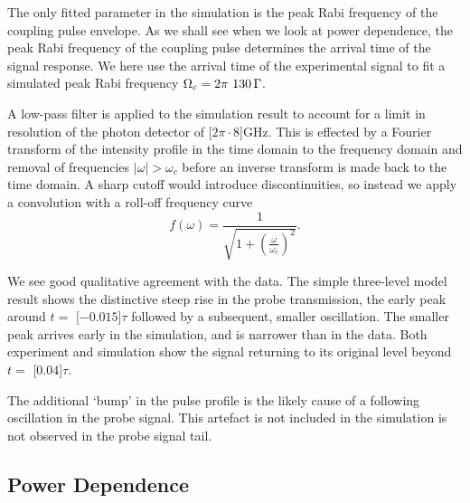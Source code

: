     The only fitted parameter in the simulation is the peak Rabi frequency of the
    coupling pulse envelope. As we shall see when we look at power dependence, the
    peak Rabi frequency of the coupling pulse determines the arrival time of the
    signal response. We here use the arrival time of the experimental signal to fit
    a simulated peak Rabi frequency $\Omega_c = \unit[2\pi~130]{\Gamma}$.

    A low-pass filter is applied to the simulation result to account for a limit
    in resolution of the photon detector of \unit[$2\pi \cdot 8$]{GHz}. This is effected by a Fourier transform of the intensity profile in the time
    domain to the frequency domain and removal of frequencies $\lvert \omega
    \rvert > \omega_c$ before an inverse transform is made back to the time
    domain. A sharp cutoff would introduce discontinuities, so instead we apply a
    convolution with a roll-off frequency curve
    \begin{equation}
        f(\omega) = \frac{1}{\sqrt{1 + 
                      \left( \frac{\omega}{\omega_c} \right)^2}}.
    \end{equation}

    We see good qualitative agreement with the data. The simple three-level model
    result shows the distinctive steep rise in the probe transmission, the early
    peak around $t = $ \unit[$-0.015$]{$\tau$} followed by a subsequent, smaller
    oscillation. The smaller peak arrives early in the simulation, and is narrower
    than in the data. Both experiment and simulation show the signal returning to
    its original level beyond $t = $ \unit[$0.04$]{$\tau$}.

    The additional `bump' in the pulse profile is the likely cause of a
    following oscillation in the probe signal. This artefact is not included in
    the simulation is not observed in the probe signal tail.

  \subsection{Power Dependence}

